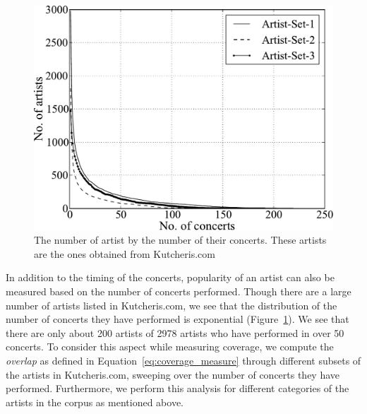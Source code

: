 \begin{figure}
	\begin{center}
		\includegraphics[width=\figSizeHundred]{ch04_datasets/figures/performances-vs-artists.pdf}
	\end{center}
	\caption{The number of artist by the number of their concerts. These artists are the ones obtained from Kutcheris.com}
	\label{fig:number_artrist_vs_number_concerts}
\end{figure}

In addition to the timing of the concerts, popularity of an artist can also be measured based on the number of concerts performed. Though there are a large number of artists listed in Kutcheris.com, we see that the distribution of the number of concerts they have performed is exponential (Figure~\ref{fig:number_artrist_vs_number_concerts}). We see that there are only about 200 artists of 2978 artists who have performed in over 50 concerts. To consider this aspect while measuring coverage, we compute the \textit{overlap} as defined in Equation~\ref{eq:coverage_measure} through different subsets of the artists in Kutcheris.com, sweeping over the number of concerts they have performed. Furthermore, we perform this analysis for different categories of the artists in the corpus as mentioned above.


